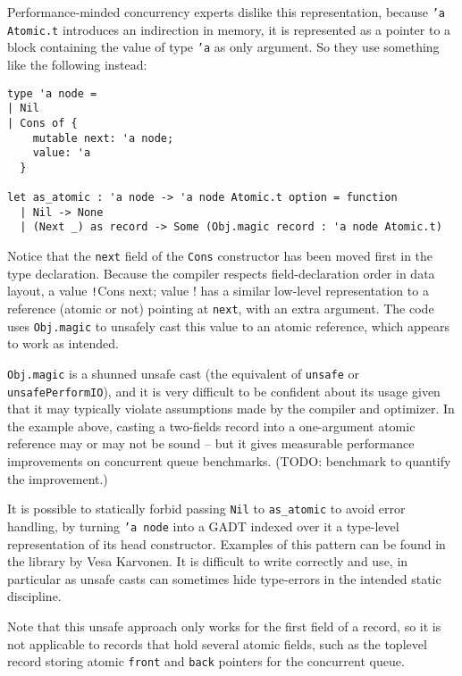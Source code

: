 Performance-minded concurrency experts dislike this representation, because \texttt{'a Atomic.t} introduces an indirection in memory, it is represented as a pointer to a block containing the value of type \texttt{'a} as only argument. So they use something like the following instead:
\begin{verbatim}
type 'a node =
| Nil
| Cons of {
    mutable next: 'a node;
    value: 'a
  }

let as_atomic : 'a node -> 'a node Atomic.t option = function
  | Nil -> None
  | (Next _) as record -> Some (Obj.magic record : 'a node Atomic.t)
\end{verbatim}
Notice that the \texttt{next} field of the \texttt{Cons} constructor has been moved first in the type declaration. Because the \OCaml compiler respects field-declaration order in data layout, a value \texttt!Cons { next; value }! has a similar low-level representation to a reference (atomic or not) pointing at \texttt{next}, with an extra argument. The code uses \texttt{Obj.magic} to unsafely cast this value to an atomic reference, which appears to work as intended.

\texttt{Obj.magic} is a shunned unsafe cast (the \OCaml equivalent of \texttt{unsafe} or \texttt{unsafePerformIO}), and it is very difficult to be confident about its usage given that it may typically violate assumptions made by the \OCaml compiler and optimizer. In the example above, casting a two-fields record into a one-argument atomic reference may or may not be sound -- but it gives measurable performance improvements on concurrent queue benchmarks. (TODO: benchmark to quantify the improvement.)

It is possible to statically forbid passing \texttt{Nil} to \texttt{as_atomic} to avoid error handling, by turning \texttt{'a node} into a GADT indexed over it a type-level representation of its head constructor. Examples of this pattern can be found in the \Kcas library by Vesa Karvonen. It is difficult to write correctly and use, in particular as unsafe casts can sometimes hide type-errors in the intended static discipline.

Note that this unsafe approach only works for the first field of a record, so it is not applicable to records that hold several atomic fields, such as the toplevel record storing atomic \texttt{front} and \texttt{back} pointers for the concurrent queue.

